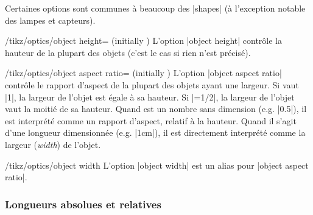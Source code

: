 \documentclass[a4paper]{ltxdoc}
\begin{document}
Certaines options sont communes à beaucoup des |shapes| (à l'exception notable des lampes et capteurs).

\begin{key}{/tikz/optics/object height= (initially )}
    L'option |object height| contrôle la hauteur de la plupart des objets (c'est le cas si rien n'est précisé).

\begin{codeexample}[width=5cm]
\end{codeexample}
\end{key}

\begin{key}{/tikz/optics/object aspect ratio= (initially )}
    L'option |object aspect ratio| contrôle le rapport d'aspect de la plupart des objets ayant une largeur. Si  vaut |1|, la largeur de l'objet est égale à sa hauteur.
    Si |=1/2|, la largeur de l'objet vaut la moitié de sa hauteur.
    Quand  est un nombre sans dimension (e.g. |0.5|), il est interprété comme un rapport d'aspect, relatif à la hauteur. Quand il s'agit d'une longueur dimensionnée (e.g. |1cm|), il est directement interprété comme la largeur (\emph{width}) de l'objet.

\begin{codeexample}[width=5cm]
\end{codeexample}
\end{key}

\begin{stylekey}{/tikz/optics/object width}
    L'option |object width| est un alias pour |object aspect ratio|.
\end{stylekey}

\subsubsection{Longueurs absolues et relatives}
\end{document}
